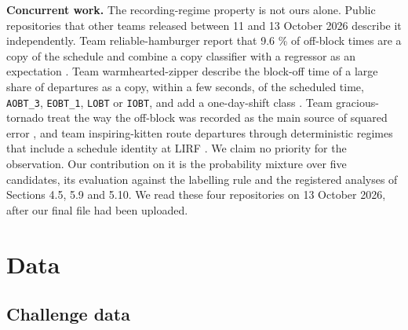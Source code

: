 \documentclass[
  manuscript=article,  %
  layout=preprint,     %
  year=2026,
  volume=4,
]{extra/joas}
\begin{document}
\textbf{Concurrent work.} The recording-regime property is not ours alone. Public repositories that other teams released between 11 and 13 October 2026 describe it independently. Team reliable-hamburger report that 9.6 \% of off-block times are a copy of the schedule and combine a copy classifier with a regressor as an expectation \autocite{reliablehamburger2026}. Team warmhearted-zipper describe the block-off time of a large share of departures as a copy, within a few seconds, of the scheduled time, \texttt{AOBT\_\allowbreak{}3}, \texttt{EOBT\_\allowbreak{}1}, \texttt{LOBT} or \texttt{IOBT}, and add a one-day-shift class \autocite{warmheartedzipper2026}. Team gracious-tornado treat the way the off-block was recorded as the main source of squared error \autocite{gracioustornado2026}, and team inspiring-kitten route departures through deterministic regimes that include a schedule identity at LIRF \autocite{inspiringkitten2026}. We claim no priority for the observation. Our contribution on it is the probability mixture over five candidates, its evaluation against the labelling rule and the registered analyses of Sections 4.5, 5.9 and 5.10. We read these four repositories on 13 October 2026, after our final file had been uploaded.

\section{Data}\label{data}

\subsection{Challenge data}\label{challenge-data}
\end{document}
